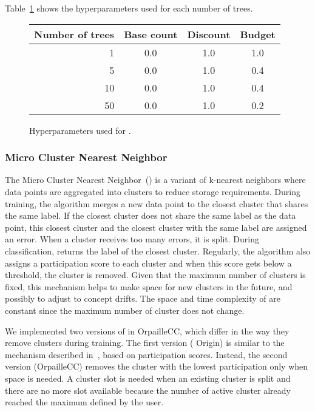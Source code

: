 Table~\ref{table:hyperparameter-mondrian} shows
the hyperparameters used for each number of trees.
\begin{figure}
	\begin{center}
		\begin{tabular}{|| r | c | c | c ||} 
			\hline
			Number of trees &  Base count & Discount & Budget \\ [0.5ex] 
			\hline\hline
			1 & 0.0 & 1.0 & 1.0 \\
			5 & 0.0 & 1.0 & 0.4 \\
			10 & 0.0 & 1.0 & 0.4 \\
			50 & 0.0 & 1.0 & 0.2 \\
			\hline
		\end{tabular}
	\end{center}
	\caption{Hyperparameters used for \mondrianforest.}
		\label{table:hyperparameter-mondrian}
\end{figure}
\subsubsection{Micro Cluster Nearest Neighbor~\cite{mc-nn}}
The Micro Cluster Nearest Neighbor~(\mcnn) is a
variant of k-nearest neighbors where data points
are aggregated into clusters to reduce storage
requirements.  During training, the algorithm
merges a new data point to the closest cluster
that shares the same label. If the closest cluster
does not share the same label as the data point,
this closest cluster and the closest cluster with
the same label are assigned an error. When a
cluster receives too many errors, it is split.
During classification, \mcnn returns the label of
the closest cluster.  Regularly, the algorithm
also assigns a participation score to each cluster
and when this score gets below a threshold, the
cluster is removed. Given that the maximum number
of clusters is fixed, this mechanism helps to make
space for new clusters in the future, and possibly
to adjust to concept drifts.  
The space and time complexity of \mcnn are
constant since the maximum number of cluster does
not change.

We implemented two versions of \mcnn in
OrpailleCC, which differ in the way they remove
clusters during training. The first version (\mcnn
Origin) is similar to the mechanism described
in~\cite{mc-nn}, based on participation scores.
Instead, the second version (\mcnn OrpailleCC)
removes the cluster with the lowest participation
only when space is needed.  A cluster slot is
needed when an existing cluster is split and there
are no more slot available because the number of
active cluster already reached the maximum defined
by the user.

